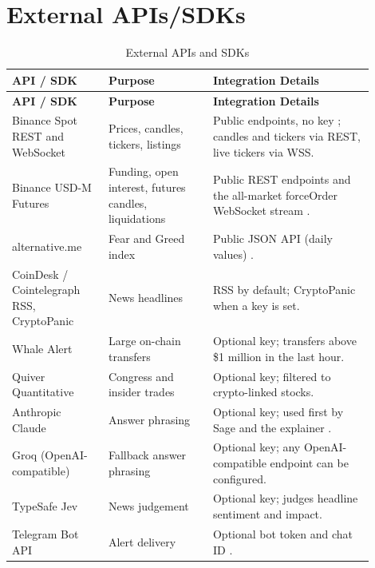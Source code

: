 \section{External APIs/SDKs}
{\renewcommand{\arraystretch}{1.3}
\begin{longtable}{|p{0.24\linewidth}|p{0.26\linewidth}|p{0.4\linewidth}|}
\caption{External APIs and SDKs}\label{tab:apis}\\\hline
\textbf{API / SDK} & \textbf{Purpose} & \textbf{Integration Details}\\\hline\endfirsthead
\hline\textbf{API / SDK} & \textbf{Purpose} & \textbf{Integration Details}\\\hline\endhead
Binance Spot REST and WebSocket & Prices, candles, tickers, listings & Public endpoints, no key \cite{binanceapi}; candles and tickers via REST, live tickers via WSS.\\\hline
Binance USD-M Futures & Funding, open interest, futures candles, liquidations & Public REST endpoints and the all-market forceOrder WebSocket stream \cite{binancefutures}.\\\hline
alternative.me & Fear and Greed index & Public JSON API (daily values) \cite{feargreed}.\\\hline
CoinDesk / Cointelegraph RSS, CryptoPanic & News headlines & RSS by default; CryptoPanic when a key is set.\\\hline
Whale Alert & Large on-chain transfers & Optional key; transfers above \$1 million in the last hour.\\\hline
Quiver Quantitative & Congress and insider trades & Optional key; filtered to crypto-linked stocks.\\\hline
Anthropic Claude & Answer phrasing & Optional key; used first by Sage and the explainer \cite{anthropic}.\\\hline
Groq (OpenAI-compatible) & Fallback answer phrasing & Optional key; any OpenAI-compatible endpoint can be configured.\\\hline
TypeSafe Jev & News judgement & Optional key; judges headline sentiment and impact.\\\hline
Telegram Bot API & Alert delivery & Optional bot token and chat ID \cite{telegram}.\\\hline
\end{longtable}}

